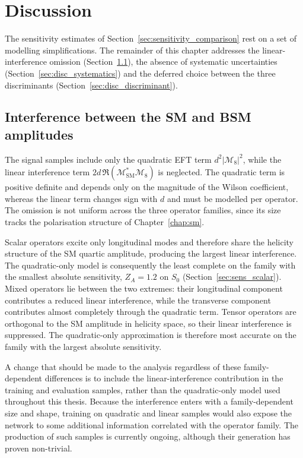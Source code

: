 \chapter{Discussion}
\label{chap:discussion}

The sensitivity estimates of Section~\ref{sec:sensitivity_comparison} rest on a set of modelling simplifications. The remainder of this chapter addresses the linear-interference omission (Section~\ref{sec:disc_interference}), the absence of systematic uncertainties (Section~\ref{sec:disc_systematics}) and the deferred choice between the three discriminants (Section~\ref{sec:disc_discriminant}).

\section{Interference between the SM and BSM amplitudes}
\label{sec:disc_interference}

The signal samples include only the quadratic EFT term $d^{2}|\mathcal{M}_{8}|^{2}$, while the linear interference term $2d\,\Re(\mathcal{M}_{\mathrm{SM}}^{*}\mathcal{M}_{8})$ is neglected. The quadratic term is positive definite and depends only on the magnitude of the Wilson coefficient, whereas the linear term changes sign with $d$ and must be modelled per operator. The omission is not uniform across the three operator families, since its size tracks the polarisation structure of Chapter~\ref{chap:sm}.

Scalar operators excite only longitudinal modes and therefore share the helicity structure of the SM quartic amplitude, producing the largest linear interference. The quadratic-only model is consequently the least complete on the family with the smallest absolute sensitivity, $Z_A=1.2$ on $S_0$ (Section~\ref{sec:sens_scalar}). Mixed operators lie between the two extremes: their longitudinal component contributes a reduced linear interference, while the transverse component contributes almost completely through the quadratic term. Tensor operators are orthogonal to the SM amplitude in helicity space, so their linear interference is suppressed. The quadratic-only approximation is therefore most accurate on the family with the largest absolute sensitivity.

A change that should be made to the analysis regardless of these family-dependent differences is to include the linear-interference contribution in the training and evaluation samples, rather than the quadratic-only model used throughout this thesis. Because the interference enters with a family-dependent size and shape, training on quadratic and linear samples would also expose the network to some additional information correlated with the operator family. The production of such samples is currently ongoing, although their generation has proven non-trivial.

